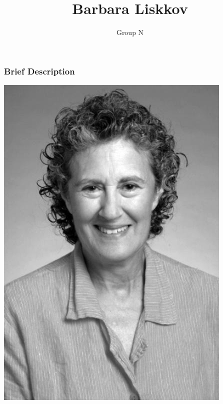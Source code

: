 \documentclass{beamer}
\title[Research Methods]{Barbara Liskkov} %
\author{Group N} %
\institute[GMIT] %
{
\textit{Grace Keane} \\\textit{Shirin Nagle} \\ %
\medskip
}
\date{}
\begin{document}
\begin{frame}
\titlepage %
\end{frame}


\begin{frame}
\frametitle{Brief Description} %

\includegraphics[scale=0.4, align=centre]{Barbara Liskov}
\centering

\end{frame}



\end{document}
